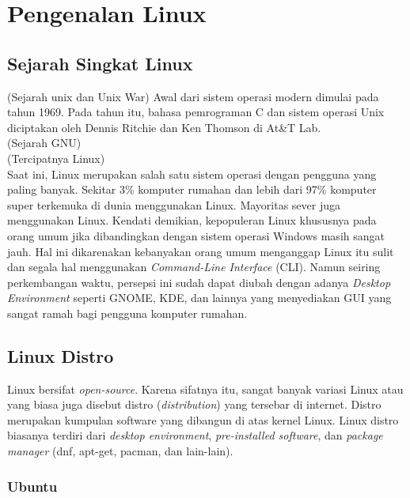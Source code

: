 \chapter{Pengenalan Linux}

\section{Sejarah Singkat Linux}
(Sejarah unix dan Unix War) Awal dari sistem operasi modern dimulai pada tahun 1969. Pada tahun itu, bahasa pemrograman C dan sistem operasi Unix diciptakan oleh Dennis Ritchie dan Ken Thomson di At\&T Lab. \\ 

(Sejarah GNU) \\ 

(Tercipatnya Linux) \\ 

Saat ini, Linux merupakan salah satu sistem operasi dengan pengguna yang paling banyak. Sekitar 3\% komputer rumahan dan lebih dari 97\% komputer super terkemuka di dunia menggunakan Linux. Mayoritas sever juga menggunakan Linux. Kendati demikian, kepopuleran Linux khususnya pada orang umum jika dibandingkan dengan sistem operasi Windows masih sangat jauh. Hal ini dikarenakan kebanyakan orang umum menganggap Linux itu sulit dan segala hal menggunakan \textit{Command-Line Interface} (CLI). Namun seiring perkembangan waktu, persepsi ini sudah dapat diubah dengan adanya \textit{Desktop Environment} seperti GNOME, KDE, dan lainnya yang menyediakan GUI yang sangat ramah bagi pengguna komputer rumahan.\\

\section{Linux Distro}
Linux bersifat \textit{open-source}. Karena sifatnya itu, sangat banyak variasi Linux atau yang biasa juga disebut distro (\textit{distribution}) yang tersebar di internet. Distro merupakan kumpulan software yang dibangun di atas kernel Linux. Linux distro biasanya terdiri dari \textit{desktop environment}, \textit{pre-installed software}, dan \textit{package manager} (dnf, apt-get, pacman, dan lain-lain). 

\subsection{Ubuntu}
